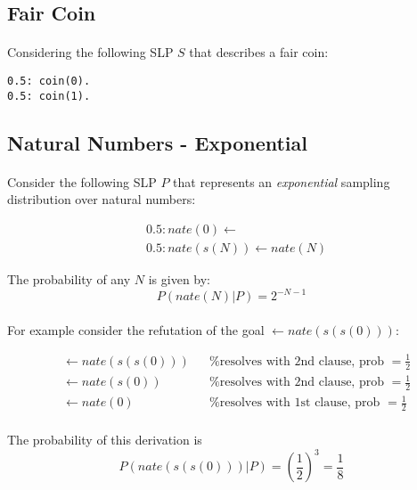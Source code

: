 \documentclass{article}
\theoremstyle{plain}
\theoremstyle{definition}
\begin{document}
\begin{multicols}{2}
\subsection{Fair Coin}\label{sec:SLPFairCoin}

\paragraph{} Considering the following SLP $S$ that describes a fair coin:

\begin{lstlisting}
0.5: coin(0).
0.5: coin(1).
\end{lstlisting}%

\subsection{Natural Numbers - Exponential}

\paragraph{} Consider the following SLP $P$ that represents an \textit{exponential} sampling distribution over natural numbers:

\begin{align*}
&0.5: nate(0) \leftarrow\\
&0.5: nate(s(N)) \leftarrow nate(N)
\end{align*}

\noindent The probability of any $N$ is given by: $$P(nate(N)|P) = 2^{-N-1}$$

\paragraph{} For example consider the refutation of the goal $\leftarrow nate(s(s(0)))$:

{\footnotesize \begin{align*}
&\leftarrow nate(s(s(0))) && \text{\% resolves with 2nd clause, prob } = \frac{1}{2}\\
&\leftarrow nate(s(0)) && \text{\% resolves with 2nd clause, prob } = \frac{1}{2}\\
&\leftarrow nate(0) && \text{\% resolves with 1st clause, prob }= \frac{1}{2}
\end{align*}}

\paragraph{} The probability of this derivation is $$P(nate(s(s(0)))|P) = \left(\frac{1}{2}\right)^3 = \frac{1}{8}$$


\end{multicols}
\end{document}
